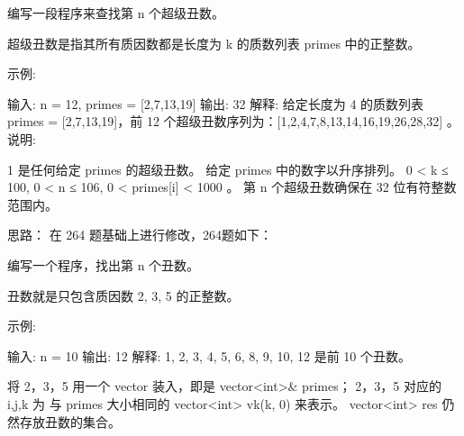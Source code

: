编写一段程序来查找第 n 个超级丑数。

超级丑数是指其所有质因数都是长度为 k 的质数列表 primes 中的正整数。

示例:

输入: n = 12, primes = [2,7,13,19]
输出: 32 
解释: 给定长度为 4 的质数列表 primes = [2,7,13,19]，前 12 个超级丑数序列为：[1,2,4,7,8,13,14,16,19,26,28,32] 。
说明:

1 是任何给定 primes 的超级丑数。
 给定 primes 中的数字以升序排列。
0 < k ≤ 100, 0 < n ≤ 106, 0 < primes[i] < 1000 。
第 n 个超级丑数确保在 32 位有符整数范围内。





















思路：
在 264 题基础上进行修改，264题如下：

编写一个程序，找出第 n 个丑数。

丑数就是只包含质因数 2, 3, 5 的正整数。

示例:

输入: n = 10
输出: 12
解释: 1, 2, 3, 4, 5, 6, 8, 9, 10, 12 是前 10 个丑数。


将 2，3，5 用一个 vector 装入，即是 vector<int>& primes；
2，3，5 对应的 i,j,k 为 与 primes 大小相同的 vector<int> vk(k, 0) 来表示。
vector<int> res 仍然存放丑数的集合。